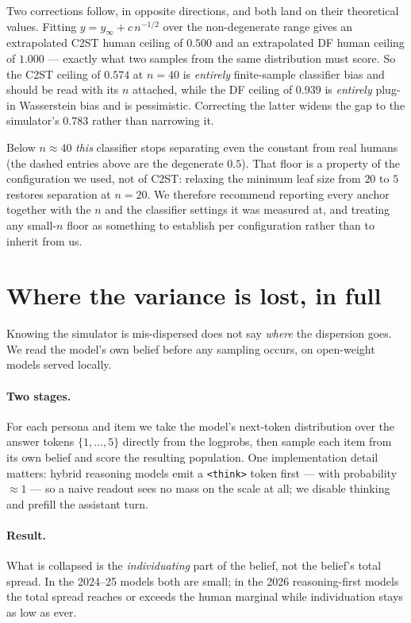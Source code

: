 \documentclass[11pt]{article}
\begin{document}
Two corrections follow, in opposite directions, and both land on their
theoretical values. Fitting $y = y_\infty + c\,n^{-1/2}$ over the non-degenerate
range gives an extrapolated C2ST human ceiling of $\mathbf{0.500}$ and an
extrapolated DF human ceiling of $\mathbf{1.000}$ --- exactly what two samples
from the same distribution must score. So the C2ST ceiling of $0.574$ at $n{=}40$
is \emph{entirely} finite-sample classifier bias and should be read with its $n$
attached, while the DF ceiling of $0.939$ is \emph{entirely} plug-in Wasserstein
bias and is pessimistic. Correcting the latter widens the gap to the simulator's
$0.783$ rather than narrowing it.

Below $n\approx40$ \emph{this} classifier stops separating even the constant from
real humans (the dashed entries above are the degenerate $0.5$). That floor is a
property of the configuration we used, not of C2ST: relaxing the minimum leaf
size from $20$ to $5$ restores separation at $n{=}20$. We therefore recommend
reporting every anchor together with the $n$ and the classifier settings it was
measured at, and treating any small-$n$ floor as something to establish per
configuration rather than to inherit from us.


\section{Where the variance is lost, in full}
\label{app:variance}


Knowing the simulator is mis-dispersed does not say \emph{where} the dispersion
goes. We read the model's own belief before any sampling occurs, on open-weight
models served locally.%


\paragraph{Two stages.} For each persona and item we take the model's
next-token distribution over the answer tokens $\{1,\dots,5\}$ directly from the
logprobs, then sample each item from its own belief and score the resulting
population. One implementation detail matters: hybrid reasoning models emit a
\texttt{<think>} token first --- with probability $\approx 1$ --- so a naive
readout sees no mass on the scale at all; we disable thinking and prefill the
assistant turn.

\paragraph{Result.} What is collapsed is the \emph{individuating} part of the
belief, not the belief's total spread. In the 2024--25 models both are small;
in the 2026 reasoning-first models the total spread reaches or exceeds the
human marginal while individuation stays as low as ever.
\end{document}
